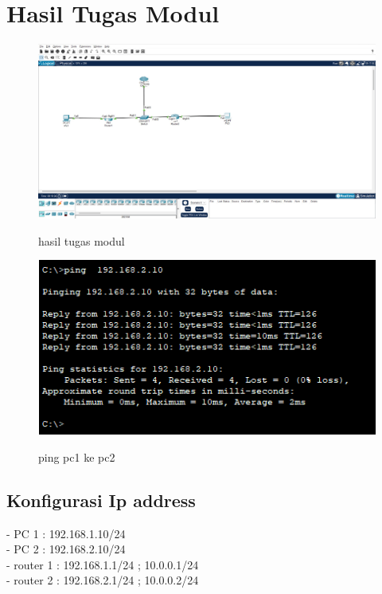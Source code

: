 \section{Hasil Tugas Modul}
\begin{figure}[H]
    \centering
    \includegraphics[width=0.65\linewidth]{image/tumod.jpg}
    \label{fig:inirujukan}
    \caption{hasil tugas modul}
\end{figure}
\begin{figure}[H]
    \centering
    \includegraphics[width=0.65\linewidth]{image/tumod1.png}
    \label{fig:inirujukan}
    \caption{ping pc1 ke pc2}
\end{figure}
\subsection {Konfigurasi Ip address} 
- PC 1 : 192.168.1.10/24 \\
- PC 2 : 192.168.2.10/24 \\
- router 1 : 192.168.1.1/24 ; 10.0.0.1/24 \\
- router 2 : 192.168.2.1/24 ; 10.0.0.2/24
